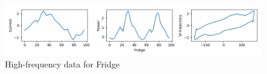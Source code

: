 \begin{figure} 
	\centering
	\includegraphics[width=1\linewidth]{images/fridge40A122}
	\caption[High-frequency data for Fridge]{High-frequency data for Fridge}
	\label{fig:fridge40A122}
\end{figure}
